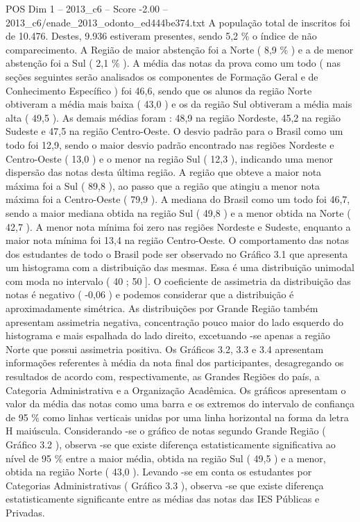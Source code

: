 \begin{textsample}{POS Dim 1 – 2013\_c6 – Score -2.00 – 2013\_c6/enade\_2013\_odonto\_ed444be374.txt}
A população total de inscritos foi de 10.476.
Destes, 9.936 estiveram presentes, sendo 5,2 \% o índice de não comparecimento.
A Região de maior abstenção foi a Norte ( 8,9 \% ) e a de menor abstenção foi a Sul ( 2,1 \% ).
A média das notas da prova como um todo ( nas seções seguintes serão analisados os componentes de Formação Geral e de Conhecimento Específico ) foi 46,6, sendo que os alunos da região Norte obtiveram a média mais baixa ( 43,0 ) e os da região Sul obtiveram a média mais alta ( 49,5 ).
As demais médias foram : 48,9 na região Nordeste, 45,2 na região Sudeste e 47,5 na região Centro-Oeste.
O desvio padrão para o Brasil como um todo foi 12,9, sendo o maior desvio padrão encontrado nas regiões Nordeste e Centro-Oeste ( 13,0 ) e o menor na região Sul ( 12,3 ), indicando uma menor dispersão das notas desta última região.
A região que obteve a maior nota máxima foi a Sul ( 89,8 ), ao passo que a região que atingiu a menor nota máxima foi a Centro-Oeste ( 79,9 ).
A mediana do Brasil como um todo foi 46,7, sendo a maior mediana obtida na região Sul ( 49,8 ) e a menor obtida na Norte ( 42,7 ).
A menor nota mínima foi zero nas regiões Nordeste e Sudeste, enquanto a maior nota mínima foi 13,4 na região Centro-Oeste.
O comportamento das notas dos estudantes de todo o Brasil pode ser observado no Gráfico 3.1 que apresenta um histograma com a distribuição das mesmas.
Essa é uma distribuição unimodal com moda no intervalo ( 40 ; 50 ].
O coeficiente de assimetria da distribuição das notas é negativo ( -0,06 ) e podemos considerar que a distribuição é aproximadamente simétrica.
As distribuições por Grande Região também apresentam assimetria negativa, concentração pouco maior do lado esquerdo do histograma e mais espalhada do lado direito, excetuando -se apenas a região Norte que possui assimetria positiva.
Os Gráficos 3.2, 3.3 e 3.4 apresentam informações referentes à média da nota final dos participantes, desagregando os resultados de acordo com, respectivamente, as Grandes Regiões do país, a Categoria Administrativa e a Organização Acadêmica.
Os gráficos apresentam o valor da média das notas como uma barra e os extremos do intervalo de confiança de 95 \% como linhas verticais unidas por uma linha horizontal na forma da letra H maiúscula.
Considerando -se o gráfico de notas segundo Grande Região ( Gráfico 3.2 ), observa -se que existe diferença estatisticamente significativa ao nível de 95 \% entre a maior média, obtida na região Sul ( 49,5 ) e a menor, obtida na região Norte ( 43,0 ).
Levando -se em conta os estudantes por Categorias Administrativas ( Gráfico 3.3 ), observa -se que existe diferença estatisticamente significante entre as médias das notas das IES Públicas e Privadas.

\end{textsample}
